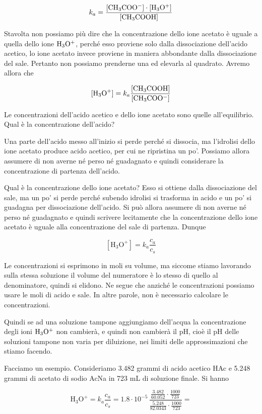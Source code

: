 $$k_a = \rm{\frac{[CH_3COO^-] \cdot [H_3O^+]}{[CH_3COOH]}}$$

Stavolta non possiamo più dire che la concentrazione dello ione acetato è uguale a quella dello ione $\rm H_3O^+$, perché esso proviene solo dalla dissociazione dell'acido acetico, lo ione acetato invece proviene in maniera abbondante dalla dissociazione del sale. Pertanto non possiamo prenderne una ed elevarla al quadrato. Avremo allora che

$$[\text{H}_3\text{O}^+] = k_a \rm{\frac{[CH_3COOH]}{[CH_3COO^-]}}$$

Le concentrazioni dell'acido acetico e dello ione acetato sono quelle all'equilibrio. Qual è la concentrazione dell'acido?

Una parte dell'acido messo all'inizio si perde perché si dissocia, ma l'idrolisi dello ione acetato produce acido acetico, per cui ne ripristina un po'. Possiamo allora assumere di non averne né perso né guadagnato e quindi considerare la concentrazione di partenza dell'acido.

Qual è la concentrazione dello ione acetato? Esso si ottiene dalla dissociazione del sale, ma un po' si perde perché subendo idrolisi si trasforma in acido e un po' si guadagna per dissociazione dell'acido. Si può allora assumere di non averne né perso né guadagnato e quindi scrivere lecitamente che la concentrazione dello ione acetato è uguale alla concentrazione del sale di partenza. Dunque

$$[\text{H}_3\text{O}^+] = k_a \frac{c_a}{c_s}$$

Le concentrazioni si esprimono in moli su volume, ma siccome stiamo lavorando sulla stessa soluzione il volume del numeratore è lo stesso di quello al denominatore, quindi si elidono. Ne segue che anziché le concentrazioni possiamo usare le moli di acido e sale. In altre parole, non è necessario calcolare le concentrazioni.

Quindi se ad una soluzione tampone aggiungiamo dell'acqua la concentrazione degli ioni $\rm H_3O^+$ non cambierà, e quindi non cambierà il pH, cioè il pH delle soluzioni tampone non varia per diluizione, nei limiti delle approssimazioni che stiamo facendo.

\vspace{0.2cm}Facciamo un esempio. Consideriamo 3.482 grammi di acido acetico HAc e 5.248 grammi di acetato di sodio AcNa in 723 mL di soluzione finale. Si hanno

$$\text{H}_3\text{O}^+=k_a\frac{c_a}{c_s}
=1.8 \cdot 10^{-5}\,\frac{\frac{3.482}{60.052} \cdot \frac{1000}{723}}{\frac{5.248}{82.0343} \cdot \frac{1000}{723}}=$$

